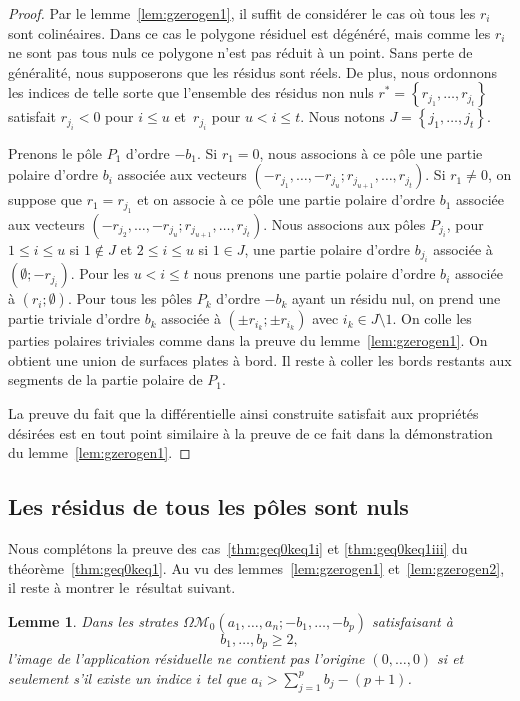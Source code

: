 \documentclass[11pt]{article}
\numberwithin{equation}{section}\renewcommand{\proofname}{Démonstration}
\let\mathcal\mathscr
\newcommand{\omoduli}[1][g]{{\Omega\mathcal M}_{\!#1}}
\newtheorem{lem}[thm]{Lemme}
\theoremstyle{definition}
\begin{document}
\begin{proof}
Par le lemme~\ref{lem:gzerogen1}, il suffit de considérer le cas où tous les $r_{i}$ sont colinéaires. Dans ce cas le polygone résiduel est dégénéré, mais comme les $r_{i}$ ne sont pas tous nuls ce polygone n'est pas réduit à un point. Sans perte de généralité, nous supposerons que les résidus sont réels. De plus, nous ordonnons les indices de telle sorte que l'ensemble des résidus non nuls $r^{\ast}=\left\{ r_{j_{1}},\dots,r_{j_{t}}\right\}$ satisfait $r_{j_{i}}<0$ pour $i\leq u$ et~$r_{j_{i}}$ pour $u<i\leq t$. Nous notons $J=\left\{ j_{1},\dots,j_{t}\right\}$.

Prenons le pôle $P_{1}$ d'ordre $-b_{1}$. Si $r_{1}=0$, nous associons à ce pôle une partie polaire d'ordre $b_{i}$ associée aux vecteurs $(-r_{j_{1}},\dots,-r_{j_{u}};r_{j_{u+1}},\dots,r_{j_{t}})$. Si $r_{1}\neq 0$, on suppose que $r_{1}=r_{j_{1}}$ et on associe à ce pôle une partie polaire d'ordre $b_{1}$ associée aux vecteurs $(-r_{j_{2}},\dots,-r_{j_{u}};r_{j_{u+1}},\dots,r_{j_{t}})$.
Nous associons aux pôles $P_{j_{i}}$, pour $1\leq i\leq u$ si $1\notin J$ et $2\leq i\leq u$ si $1\in J$, une partie polaire d'ordre $b_{j_{i}}$ associée à $(\emptyset;-r_{j_{i}})$. Pour les $u< i\leq t$ nous prenons une partie polaire d'ordre $b_{i}$ associée à $(r_{i};\emptyset)$. Pour tous les pôles $P_{k}$ d'ordre $-b_{k}$ ayant un résidu nul, on prend une partie triviale d'ordre $b_{k}$ associée à $(\pm r_{i_{k}};\pm r_{i_{k}})$ avec $i_{k}\in J \setminus 1$. On colle les parties polaires triviales comme dans la preuve du lemme~\ref{lem:gzerogen1}. On obtient une union de surfaces plates à bord. Il reste à coller les bords restants aux segments de la partie polaire de $P_{1}$.

La preuve du fait que la différentielle ainsi construite satisfait aux propriétés désirées est en tout point similaire à la preuve de ce fait dans la démonstration du lemme~\ref{lem:gzerogen1}.
\end{proof}

\subsection{Les résidus de tous les pôles sont nuls}
\label{sec:casreszero}
Nous complétons la preuve des cas~\eqref{thm:geq0keq1i} et \eqref{thm:geq0keq1iii} du théorème~\ref{thm:geq0keq1}. Au vu des lemmes~\ref{lem:gzerogen1} et~\ref{lem:gzerogen2}, il reste à montrer le~résultat suivant.
\begin{lem}\label{lem:condgzero}
Dans les strates $\omoduli[0](a_{1},\dots,a_{n};-b_{1},\dots,-b_{p})$ satisfaisant à
\[
b_{1},\dots,b_{p} \geq 2,
\]
l'image de l'application résiduelle ne contient pas l'origine $(0,\dots,0)$ si et seulement s'il existe un indice $i$ tel que $a_{i}>\sum_{j=1}^{p}b_{j}-(p+1)$.
\end{lem}
\end{document}
